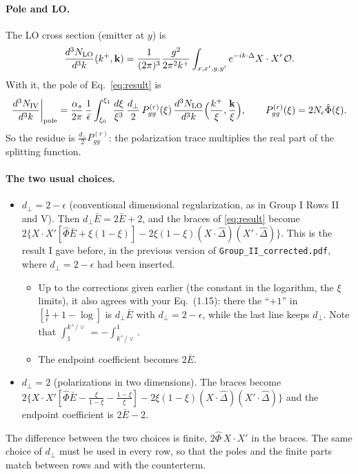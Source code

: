 \documentclass[10pt]{article}
\numberwithin{equation}{section}
\newcommand{\Dh}{\hat\Delta}
\newcommand{\OO}{\mathcal O}
\begin{document}
\paragraph{Pole and LO.} The LO cross section (emitter at $y$) is
\begin{equation}
\frac{d^3N_{\rm LO}}{d^3k}(k^+,\mathbf k)=\frac{1}{(2\pi)^3}\frac{g^2}{2\pi^2k^+}\int_{x,x',y,y'}e^{-ik\cdot\Delta}X\cdot X'\,\OO .
\end{equation}
With it, the pole of Eq.~\eqref{eq:result} is
\begin{equation}
\frac{d^3N_{\rm IV}}{d^3k}\bigg|_{\rm pole}=\frac{\alpha_s}{2\pi}\,\frac1{\bar\epsilon}\int_{\xi_0}^{\xi_1}\frac{d\xi}{\xi^3}\,\frac{d_\perp}{2}\,P^{(r)}_{gg}(\xi)\,\frac{d^3N_{\rm LO}}{d^3k}\Big(\frac{k^+}{\xi},\frac{\mathbf k}{\xi}\Big),\qquad P^{(r)}_{gg}(\xi)=2N_c\hat\Phi(\xi).
\label{eq:pole}
\end{equation}
So the residue is $\frac{d_\perp}{2}P^{(r)}_{gg}$: the polarization trace multiplies the real part of the splitting function.

\paragraph{The two usual choices.}
\begin{itemize}
\item $d_\perp=2-\epsilon$ (conventional dimensional regularization, as in Group I Rows II and V). Then $d_\perp\bar E=2\bar E+2$, and the braces of \eqref{eq:result} become $2\{X\cdot X'[\hat\Phi\bar E+\xi(1-\xi)]-2\xi(1-\xi)(X\cdot\Dh)(X'\cdot\Dh)\}$. This is the result I gave before, in the previous version of \texttt{Group\_II\_corrected.pdf}, where $d_\perp=2-\epsilon$ had been inserted.
\begin{itemize}
\item Up to the corrections given earlier (the constant in the logarithm, the $\xi$ limits), it also agrees with your Eq.~(1.15): there the ``$+1$'' in $[\frac1{\bar\epsilon}+1-\log]$ is $d_\perp\bar E$ with $d_\perp=2-\epsilon$, while the last line keeps $d_\perp$. Note that $\int_1^{k^+/\vee}=-\int_{k^+/\vee}^{1}$.
\item The endpoint coefficient becomes $2\bar E$.
\end{itemize}
\item $d_\perp=2$ (polarizations in two dimensions). The braces become $2\{X\cdot X'[\hat\Phi\bar E-\frac{\xi}{1-\xi}-\frac{1-\xi}{\xi}]-2\xi(1-\xi)(X\cdot\Dh)(X'\cdot\Dh)\}$ and the endpoint coefficient is $2\bar E-2$.
\end{itemize}
The difference between the two choices is finite, $2\hat\Phi\,X\cdot X'$ in the braces. The same choice of $d_\perp$ must be used in every row, so that the poles and the finite parts match between rows and with the counterterm.
\end{document}
